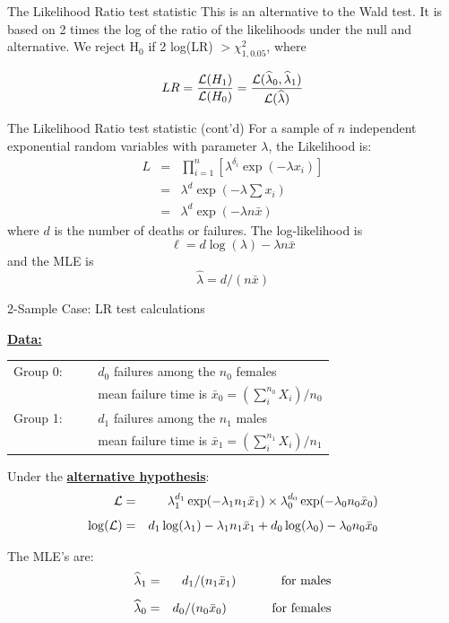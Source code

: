\documentclass[envcountsect, 10pt, portrait, palatino]{beamer}
\begin{document}
\begin{frame}{The Likelihood Ratio test statistic}
This is an alternative to the Wald test. It is based on 2 times the log of the
ratio of the likelihoods under the null and alternative.
We reject  H$_0$ if 2 log(LR) $> \chi^2_{1,0.05}$, where

\[ LR  = \frac{{\cal L}(H_1)}{{\cal L}(H_0)}  =
\frac{{\cal L}(\widehat{\lambda}_0,\widehat{\lambda}_1)}
{{\cal L}(\widehat{\lambda})} \]
\end{frame} 
\begin{frame}{The Likelihood Ratio test statistic (cont'd)}
For a sample of $n$ independent exponential random
variables with parameter $\lambda$,  the  Likelihood is:\\
\begin{eqnarray*}
  L &  = &  \prod_{i=1}^{n} [\lambda^{\delta_i} \exp(-\lambda x_i)]\\
    &  = &  \lambda^{d} \exp(-\lambda \sum x_i)\\
    &  = &  \lambda^{d} \exp(-\lambda n \bar{x})
\end{eqnarray*}
where $d$ is the number of deaths or failures.  The  log-likelihood is
\[ \ell = d \log(\lambda)  - \lambda n \bar{x}\]
and the MLE is \[ \widehat{\lambda}=d/(n \bar{x})\]
\end{frame} 
\begin{frame}{2-Sample Case:  LR test calculations}

\underline{\bf Data:}

\begin{tabular}{ll}
Group 0: ~~~ & $d_0$ failures among the $n_0$ females\\
             & mean failure time is $\bar{x}_0 = (\sum_i^{n_0} X_i)/n_0$\\[1ex]
Group 1: ~~~ & $d_1$ failures among the $n_1$ males\\
             & mean failure time is $\bar{x}_1 = (\sum_i^{n_1} X_i)/n_1$\\
\end{tabular}

\vspace{0.3in}
Under the \underline{\bf alternative hypothesis}:
\begin{eqnarray*}
{\cal L} & = & \lambda_1^{d_1} \exp(-\lambda_1 n_1 \bar{x}_1) \times
  \lambda_0^{d_0} \exp(-\lambda_0 n_0 \bar{x}_0)\\[1ex]
\log({\cal L}) & = &  d_1 \log(\lambda_1) - \lambda_1 n_1 \bar{x}_1 +
      d_0 \log(\lambda_0) - \lambda_0 n_0 \bar{x}_0
\end{eqnarray*}

The MLE's are:
\begin{eqnarray*}
\widehat{\lambda}_1 & = & d_1/(n_1 \bar{x}_1) \hspace{0.5in}
\mbox{for males}\\[1ex]
\widehat{\lambda}_0 & = & d_0/(n_0 \bar{x}_0) \hspace{0.5in}
\mbox{for females}
\end{eqnarray*}
\end{frame}
\end{document}
